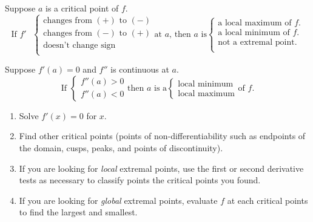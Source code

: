 \begin{thm}
Suppose $a$ is a critical point of $f$.
$$\text{If $f'$ } \begin{cases}
\text{changes from $(+)$ to $(-)$}\\
\text{changes from $(-)$ to $(+)$}\\
\text{doesn't change sign}\\
\end{cases}
\text{at $a$, then $a$ is}
\begin{cases}
\text{a local maximum of $f$}.\\
\text{a local minimum of $f$}.\\
\text{not a extremal point}.\\
\end{cases}$$
\end{thm}


\begin{thm}
Suppose $f'(a)=0$ and $f''$ is continuous at $a$.
$$\text{If } \begin{cases}
f''(a)>0\\
f''(a)<0
\end{cases}
\text{then $a$ is a}
\begin{cases}
\text{local minimum}\\
\text{local maximum}
\end{cases} \text{of $f$}.$$
\end{thm}


\begin{strat}
\begin{enumerate}[leftmargin=1em]
\item Solve $f'(x)=0$ for $x$.
\item Find other critical points (points of non-differentiability such as endpoints of the domain, cusps, peaks, and points of discontinuity).
\item If you are looking for \textit{local} extremal points, use the first or second derivative tests as necessary to classify points the critical points you found.
\item If you are looking for \textit{global} extremal points, evaluate $f$ at each critical points to find the largest and smallest.
\end{enumerate}
\end{strat}










